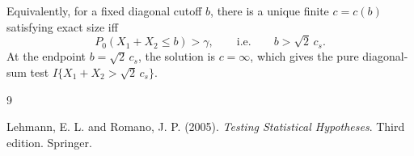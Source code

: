 \documentclass[12pt]{article}
\theoremstyle{definition}
\theoremstyle{remark}
\begin{document}
Equivalently, for a fixed diagonal cutoff \(b\), there is a unique finite
\(c=c(b)\) satisfying exact size iff
\[
P_0(X_1+X_2\le b)>\gamma,
\qquad\text{i.e.}\qquad
b>\sqrt 2\,c_s .
\]
At the endpoint \(b=\sqrt 2\,c_s\), the solution is \(c=\infty\), which gives
the pure diagonal-sum test \(I\{X_1+X_2>\sqrt 2\,c_s\}\).

 

    \begin{thebibliography}{9}

Lehmann, E. L. and Romano, J. P. (2005).
\textit{Testing Statistical Hypotheses}.
Third edition. Springer.

\end{thebibliography}
\end{document}
